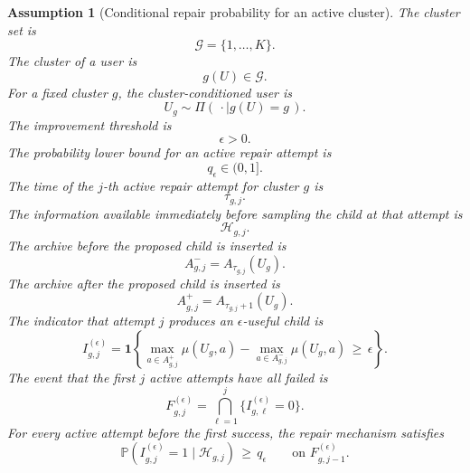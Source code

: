 \documentclass{article} %
\newtheorem{assumption}{Assumption}
\begin{document}
\begin{assumption}[Conditional repair probability for an active cluster]
\label{assump:app-repair}
The cluster set is
\begin{equation}
\label{eq:app-third-cluster-set}
\mathcal{G}
=
\{1,\ldots,K\}.
\end{equation}
The cluster of a user is
\begin{equation}
\label{eq:app-third-cluster-map}
g(U)
\in
\mathcal{G}.
\end{equation}
For a fixed cluster \(g\), the cluster-conditioned user is
\begin{equation}
\label{eq:app-third-conditioned-user}
U_g
\sim
\Pi(\,\cdot \mid g(U)=g\,).
\end{equation}
The improvement threshold is
\begin{equation}
\label{eq:app-third-epsilon}
\epsilon
>
0.
\end{equation}
The probability lower bound for an active repair attempt is
\begin{equation}
\label{eq:app-third-q}
q_{\epsilon}
\in
(0,1].
\end{equation}
The time of the \(j\)-th active repair attempt for cluster \(g\) is
\begin{equation}
\label{eq:app-third-attempt-time}
\tau_{g,j}.
\end{equation}
The information available immediately before sampling the child at that attempt is
\begin{equation}
\label{eq:app-third-attempt-field}
\mathcal{H}_{g,j}.
\end{equation}
The archive before the proposed child is inserted is
\begin{equation}
\label{eq:app-third-archive-before}
A_{g,j}^{-}
=
A_{\tau_{g,j}}(U_g).
\end{equation}
The archive after the proposed child is inserted is
\begin{equation}
\label{eq:app-third-archive-after}
A_{g,j}^{+}
=
A_{\tau_{g,j}+1}(U_g).
\end{equation}
The indicator that attempt \(j\) produces an \(\epsilon\)-useful child is
\begin{equation}
\label{eq:app-third-success-indicator}
I_{g,j}^{(\epsilon)}
=
\mathbf{1}\!\left\{
\max_{a\in A_{g,j}^{+}}\mu(U_g,a)
-
\max_{a\in A_{g,j}^{-}}\mu(U_g,a)
\,\ge\,
\epsilon
\right\}.
\end{equation}
The event that the first \(j\) active attempts have all failed is
\begin{equation}
\label{eq:app-third-failure-event}
F_{g,j}^{(\epsilon)}
=
\bigcap_{\ell=1}^{j}
\{I_{g,\ell}^{(\epsilon)}=0\}.
\end{equation}
For every active attempt before the first success, the repair mechanism satisfies
\begin{equation}
\label{eq:app-third-repair-condition}
\mathbb{P}\!\left(
I_{g,j}^{(\epsilon)}=1
\mid
\mathcal{H}_{g,j}
\right)
\,\ge\,
q_{\epsilon}
\qquad
\text{on }F_{g,j-1}^{(\epsilon)}.
\end{equation}
\end{assumption}
\end{document}
